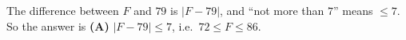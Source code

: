 The difference between $F$ and $79$ is $|F-79|$, and ``not more than $7$'' means $\le7$. So the answer is \textbf{(A)} $|F-79|\le7$, i.e.\ $72\le F\le86$.
